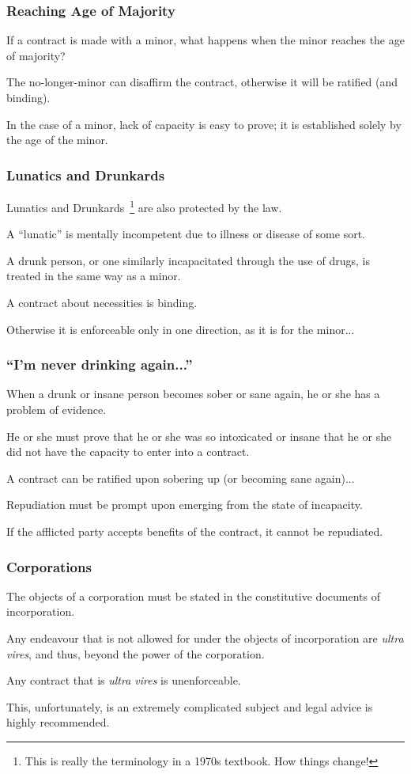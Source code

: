 \begin{frame}
\frametitle{Reaching Age of Majority}

If a contract is made with a minor, what happens when the minor reaches the age of majority?

The no-longer-minor can disaffirm the contract, otherwise it will be ratified (and binding).

In the case of a minor, lack of capacity is easy to prove; it is established solely by the age of the minor.


\end{frame}



\begin{frame}
\frametitle{Lunatics and Drunkards}

Lunatics and Drunkards~\cite{lba}\footnote{This is really the terminology in a 1970s textbook. How things change!} are also protected by the law.

A ``lunatic'' is mentally incompetent due to illness or disease of some sort. 

A drunk person, or one similarly incapacitated through the use of drugs, is treated in the same way as a minor.

A contract about necessities is binding.

Otherwise it is enforceable only in one direction, as it is for the minor...

\end{frame}



\begin{frame}
\frametitle{``I'm never drinking again...''}

When a drunk or insane person becomes sober or sane again, he or she has a problem of evidence.

He or she must prove that he or she was so intoxicated or insane that he or she did not have the capacity to enter into a contract.

A contract can be ratified upon sobering up (or becoming sane again)...

Repudiation must be prompt upon emerging from the state of incapacity.


If the afflicted party accepts benefits of the contract, it cannot be repudiated.

\end{frame}



\begin{frame}
\frametitle{Corporations}

The objects of a corporation must be stated in the constitutive documents of incorporation.

	Any endeavour that is not allowed for under the objects of incorporation are \textit{ultra vires}, and thus, beyond the power of the corporation.

	Any contract that is \textit{ultra vires} is unenforceable.

This, unfortunately, is an extremely complicated subject and legal advice is highly recommended.

\end{frame}

